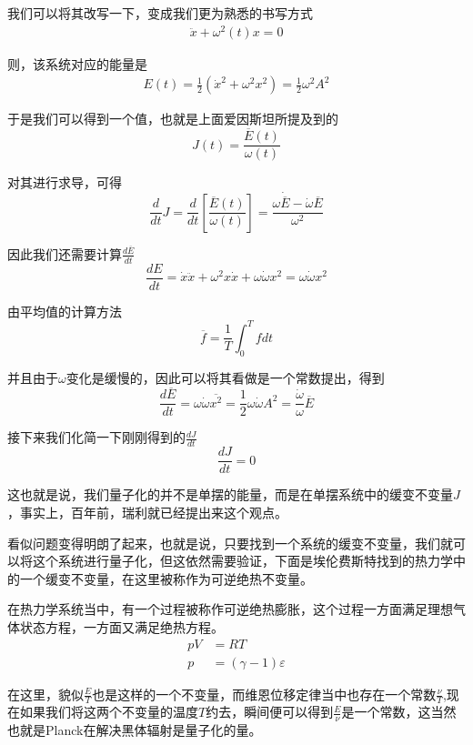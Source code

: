\documentclass{article}
\begin{document}
我们可以将其改写一下，变成我们更为熟悉的书写方式
\begin{align*}
    \ddot{x}+\omega^2(t)x=0
\end{align*}

则，该系统对应的能量是
\begin{align*}
    E(t) = \frac{1}{2}(\dot{x}^2+\omega^2x^2)=\frac{1}{2}\omega^2A^2
\end{align*}

于是我们可以得到一个值，也就是上面爱因斯坦所提及到的
\[J(t) = \frac{\overline{E}(t)}{\omega(t)}\]

对其进行求导，可得
\begin{equation*}
    \frac{d}{dt}J = \frac{d}{dt}\left[\frac{\overline{E}(t)}{\omega(t)}\right]=\frac{\omega\dot{\overline{E}}-\dot{\omega}\overline{E}}{\omega^2}
\end{equation*}

因此我们还需要计算$\displaystyle \frac{d\overline{E}}{dt}$
\[\frac{dE}{dt}=\dot{x}\ddot{x}+\omega^2x\dot{x}+\omega\dot{\omega}x^2=\omega\dot{\omega}x^2\]

由平均值的计算方法
\[\overline{f}=\frac{1}{T}\int_0^T fdt\]

并且由于$\omega$变化是缓慢的，因此可以将其看做是一个常数提出，得到
\[\frac{d\overline{E}}{dt}=\omega\dot{\omega}\overline{x^2}=\frac{1}{2}\omega\dot{\omega}A^2=\frac{\dot{\omega}}{\omega}\overline{E}\]

接下来我们化简一下刚刚得到的$\displaystyle \frac{dJ}{dt}$
\[\frac{dJ}{dt}=0\]

这也就是说，我们量子化的并不是单摆的能量，而是在单摆系统中的缓变不变量$J$，事实上，百年前，瑞利就已经提出来这个观点。

看似问题变得明朗了起来，也就是说，只要找到一个系统的缓变不变量，我们就可以将这个系统进行量子化，但这依然需要验证，下面是埃伦费斯特找到的热力学中的一个缓变不变量，在这里被称作为可逆绝热不变量。

在热力学系统当中，有一个过程被称作可逆绝热膨胀，这个过程一方面满足理想气体状态方程，一方面又满足绝热方程。
\begin{align*}
    pV & = RT                    \\
    p  & = (\gamma-1)\varepsilon
\end{align*}

在这里，貌似$\displaystyle \frac{E}{T}$也是这样的一个不变量，而维恩位移定律当中也存在一个常数$\displaystyle \frac{\nu}{T}$,现在如果我们将这两个不变量的温度$T$约去，瞬间便可以得到$\displaystyle\frac{E}{\nu}$是一个常数，这当然也就是Planck在解决黑体辐射是量子化的量。
\end{document}
